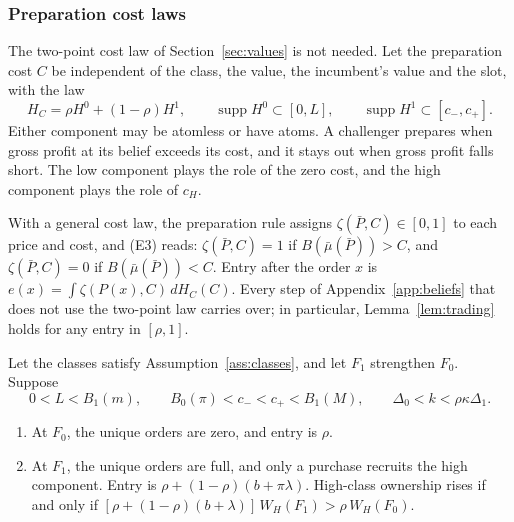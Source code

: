 \subsubsection*{Preparation cost laws}

The two-point cost law of Section~\ref{sec:values} is not needed. Let the preparation cost \(C\) be independent of
the class, the value, the incumbent's value and the slot, with the law
\[
H_C=\rho H^0+(1-\rho)H^1,\qquad \operatorname{supp}H^0\subset[0,L],\qquad \operatorname{supp}H^1\subset[c_-,c_+].
\]
Either component may be atomless or have atoms. A challenger prepares when gross profit at its belief exceeds its
cost, and it stays out when gross profit falls short. The low component plays the role of the zero cost, and the high
component plays the role of \(c_H\).

With a general cost law, the preparation rule assigns \(\zeta(\bar P,C)\in[0,1]\) to each price and cost, and (E3)
reads: \(\zeta(\bar P,C)=1\) if \(B(\bar\mu(\bar P))>C\), and \(\zeta(\bar P,C)=0\) if \(B(\bar\mu(\bar P))<C\). Entry
after the order \(x\) is \(e(x)=\int\zeta(P(x),C)\,dH_C(C)\). Every step of Appendix~\ref{app:beliefs} that does not
use the two-point law carries over; in particular, Lemma~\ref{lem:trading} holds for any entry in \([\rho,1]\).

\begin{proposition}\label{prop:atomless}
Let the classes satisfy Assumption~\ref{ass:classes}, and let \(F_1\) strengthen \(F_0\). Suppose
\[
0<L<B_1(m),\qquad B_0(\pi)<c_-<c_+<B_1(M),\qquad \Delta_0<k<\rho\kappa\Delta_1.
\]
\begin{enumerate}[label=(\roman*),leftmargin=2em]
\item At \(F_0\), the unique orders are zero, and entry is \(\rho\).
\item At \(F_1\), the unique orders are full, and only a purchase recruits the high component. Entry is
\(\rho+(1-\rho)(b+\pi\lambda)\). High-class ownership rises if and only if
\([\rho+(1-\rho)(b+\lambda)]\,W_H(F_1)>\rho\,W_H(F_0)\).
\end{enumerate}
\end{proposition}

